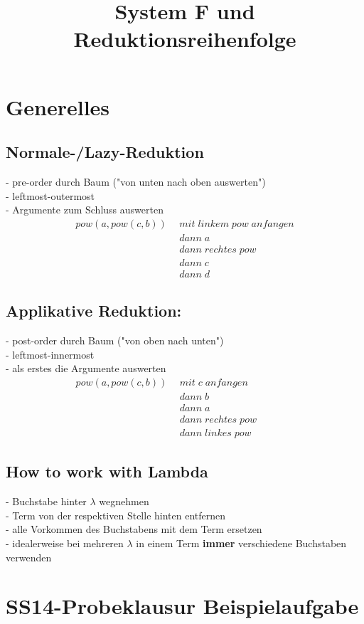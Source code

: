 \documentclass{article}
\title{System F und Reduktionsreihenfolge}
\date{ }
\begin{document}
	\section{Generelles}
		\subsection{Normale-/Lazy-Reduktion}
			- pre-order durch Baum ("von unten nach oben auswerten")	\\
			- leftmost-outermost\\
			- Argumente zum Schluss auswerten
			\begin{align*}			
				pow(a,pow(c,b))\:\:	& mit\;linkem\;pow\;anfangen\\
									& dann\;a\\
									& dann\;rechtes\;pow\\
									& dann\;c\\
									& dann\;d
			\end{align*}
		\subsection{Applikative Reduktion:}
			- post-order durch Baum ("von oben nach unten")\\
			- leftmost-innermost\\
			- als erstes die Argumente auswerten
			\begin{align*}
				pow(a,pow(c,b))\:\: & mit\;c\;anfangen
				\enspace\;\;\;\;\;\;\;\;\;\enspace\;\;\;\;
											\\
									& dann\;b\\
									& dann\;a\\
									& dann\;rechtes\;pow\\
									& dann\;linkes\;pow
			\end{align*}
		\subsection{How to work with Lambda}
			- Buchstabe hinter $\lambda $ wegnehmen\\
			- Term von der respektiven Stelle hinten entfernen\\
			- alle Vorkommen des Buchstabens mit dem Term ersetzen\\
			- idealerweise bei mehreren $\lambda$ in einem Term \textbf{immer} verschiedene Buchstaben verwenden
	\section{SS14-Probeklausur Beispielaufgabe}
\end{document}
